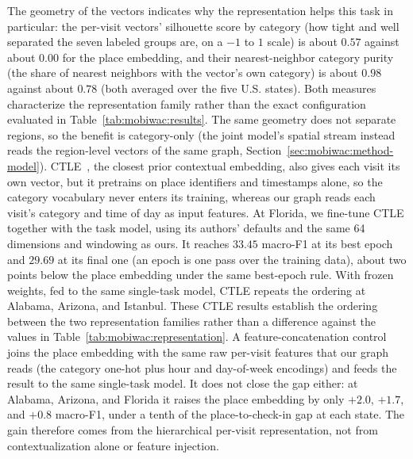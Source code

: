 The geometry of the vectors indicates why the representation helps this task in
particular: the per-visit vectors' silhouette score by category (how tight and well separated the seven labeled groups are, on a $-1$ to $1$ scale) is about $0.57$ against about $0.00$ for the place embedding, and their nearest-neighbor category purity (the share of nearest neighbors with the vector's own category) is about $0.98$ against about $0.78$ (both averaged over the five U.S. states). Both measures characterize the representation family rather than the exact configuration
evaluated in Table~\ref{tab:mobiwac:results}. The same geometry does not separate regions, so the benefit is category-only (the joint model's spatial stream instead reads the region-level vectors of the same graph, Section~\ref{sec:mobiwac:method-model}). CTLE~\cite{lin2021ctle}, the closest prior contextual embedding, also gives each visit its own vector, but it pretrains on place identifiers and timestamps alone, so the category vocabulary never enters its training, whereas our graph reads each visit's category and time of day as input features. At Florida, we fine-tune CTLE together with the task model, using its authors' defaults and the same 64 dimensions and windowing as ours. It reaches $33.45$ macro-F1 at its best epoch and $29.69$ at its final one (an epoch is one pass over the training data), about two points below the place embedding under the same best-epoch rule. With frozen weights, fed to the same single-task model, CTLE repeats the ordering at Alabama, Arizona, and Istanbul. These CTLE results establish the ordering between the two representation families rather than a
difference against the values in Table~\ref{tab:mobiwac:representation}. A feature-concatenation control joins the place embedding with the same raw
per-visit features that our graph reads (the category one-hot plus hour and
day-of-week encodings) and feeds the result to the same single-task model. It
does not close the gap either: at Alabama, Arizona, and Florida it raises the
place embedding by only $+2.0$, $+1.7$, and $+0.8$ macro-F1, under a tenth of
the place-to-check-in gap at each state. The gain therefore comes from
the hierarchical per-visit representation, not from contextualization alone or
feature injection.

